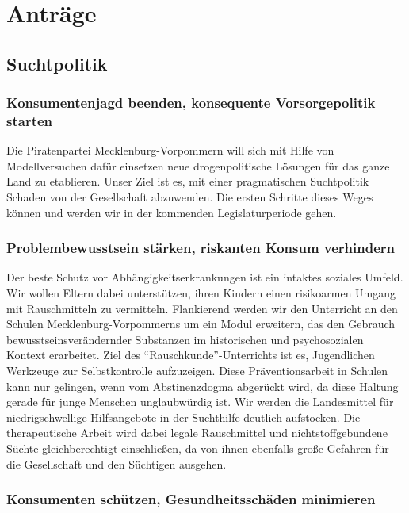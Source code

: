 \section{Anträge}

\subsection{Suchtpolitik}

\subsubsection{Konsumentenjagd beenden, konsequente Vorsorgepolitik starten}

Die Piratenpartei Mecklenburg-Vorpommern will sich mit Hilfe von Modellversuchen dafür einsetzen neue drogenpolitische Lösungen für das ganze Land zu etablieren. Unser Ziel ist es, mit einer pragmatischen Suchtpolitik Schaden von der Gesellschaft abzuwenden. Die ersten Schritte dieses Weges können und werden wir in der kommenden Legislaturperiode gehen.

\subsubsection{Problembewusstsein stärken, riskanten Konsum verhindern}

Der beste Schutz vor Abhängigkeitserkrankungen ist ein intaktes soziales Umfeld. Wir wollen Eltern dabei unterstützen, ihren Kindern einen risikoarmen Umgang mit Rauschmitteln zu vermitteln. Flankierend werden wir den Unterricht an den Schulen Mecklenburg-Vorpommerns um ein Modul erweitern, das den Gebrauch bewusstseinsverändernder Substanzen im historischen und psychosozialen Kontext erarbeitet. Ziel des ``Rauschkunde''-Unterrichts ist es, Jugendlichen Werkzeuge zur Selbstkontrolle aufzuzeigen. Diese Präventionsarbeit in Schulen kann nur gelingen, wenn vom Abstinenzdogma abgerückt wird, da diese Haltung gerade für junge Menschen unglaubwürdig ist. Wir werden die Landesmittel für niedrigschwellige Hilfsangebote in der Suchthilfe deutlich aufstocken. Die therapeutische Arbeit wird dabei legale Rauschmittel und nichtstoffgebundene Süchte gleichberechtigt einschließen, da von ihnen ebenfalls große Gefahren für die Gesellschaft und den Süchtigen ausgehen.

\subsubsection{Konsumenten schützen, Gesundheitsschäden minimieren}

